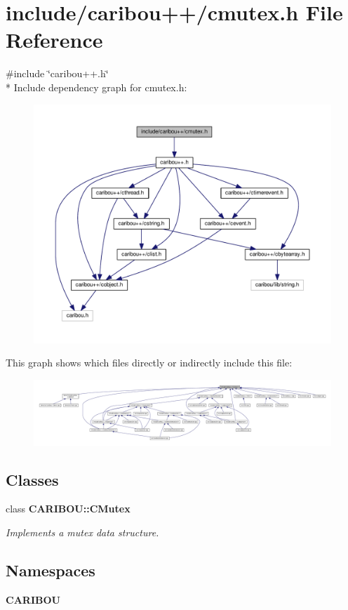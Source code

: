 \section{include/caribou++/cmutex.h File Reference}
\label{cmutex_8h}
{\ttfamily \#include \char`\"{}caribou++.\-h\char`\"{}}\\*
Include dependency graph for cmutex.\-h\-:\nopagebreak
\begin{figure}[H]
\begin{center}
\leavevmode
\includegraphics[width=350pt]{cmutex_8h__incl}
\end{center}
\end{figure}
This graph shows which files directly or indirectly include this file\-:\nopagebreak
\begin{figure}[H]
\begin{center}
\leavevmode
\includegraphics[width=350pt]{cmutex_8h__dep__incl}
\end{center}
\end{figure}
\subsection*{Classes}
\begin{DoxyCompactItemize}
\item 
class {\bf C\-A\-R\-I\-B\-O\-U\-::\-C\-Mutex}
\begin{DoxyCompactList}\small\item\em Implements a mutex data structure. \end{DoxyCompactList}\end{DoxyCompactItemize}
\subsection*{Namespaces}
\begin{DoxyCompactItemize}
\item 
{\bf C\-A\-R\-I\-B\-O\-U}
\end{DoxyCompactItemize}
